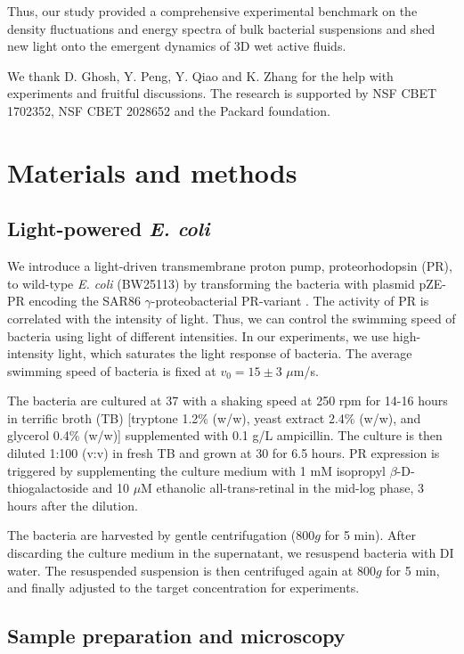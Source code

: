 \documentclass[twocolumn,aps,prx,amsmath,amssymb,longbibliography,superscriptaddress]{revtex4-2}
\begin{document}
Thus, our study provided a comprehensive experimental benchmark on the density fluctuations and energy spectra of bulk bacterial suspensions and shed new light onto the emergent dynamics of 3D wet active fluids.


\begin{acknowledgements}
	We thank D. Ghosh, Y. Peng, Y. Qiao and K. Zhang for the help with experiments and fruitful discussions. The research is supported by NSF CBET 1702352, NSF CBET 2028652 and the Packard foundation.
\end{acknowledgements}

\appendix
\section{Materials and methods} \label{appendix-MM}
\subsection{Light-powered \textit{E. coli}}
We introduce a light-driven transmembrane proton pump, proteorhodopsin (PR), to wild-type \textit{E. coli} (BW25113) by transforming the bacteria with plasmid pZE-PR encoding the SAR86 $\gamma$-proteobacterial PR-variant \cite{Walter2007}. The activity of PR is correlated with the intensity of light. Thus, we can control the swimming speed of bacteria using light of different intensities. In our experiments, we use high-intensity light, which saturates the light response of bacteria. The average swimming speed of bacteria is fixed at $v_0 = 15 \pm 3$ $\mu$m/s.

The bacteria are cultured at 37 \textcelsius{} with a shaking speed at 250 rpm for 14-16 hours in terrific broth (TB) [tryptone 1.2\% (w/w), yeast extract 2.4\% (w/w), and glycerol 0.4\% (w/w)] supplemented with 0.1 g/L ampicillin. The culture is then diluted 1:100 (v:v) in fresh TB and grown at 30 \textcelsius{} for 6.5 hours. PR expression is triggered by supplementing the culture medium with 1 mM isopropyl $\beta$-D-thiogalactoside and 10  $\mu$M ethanolic all-trans-retinal in the mid-log phase, 3 hours after the dilution.

The bacteria are harvested by gentle centrifugation ($800g$ for 5 min). After discarding the culture medium in the supernatant, we resuspend bacteria with DI water. The resuspended suspension is then centrifuged again at $800g$ for 5 min, and finally adjusted to the target concentration for experiments.

\subsection{Sample preparation and microscopy}
\end{document}
